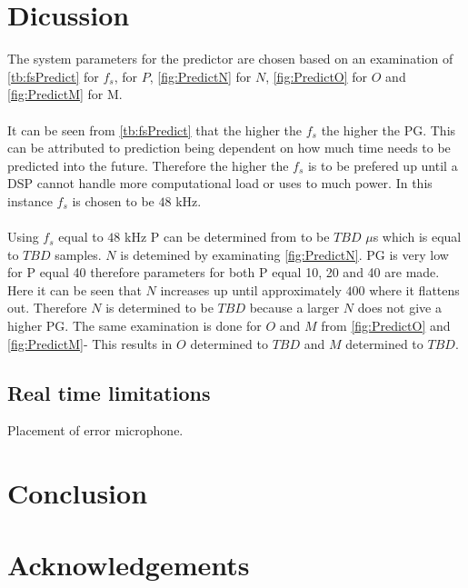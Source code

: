 \section{Dicussion}
The system parameters for the predictor are chosen based on an examination of \autoref{tb:fsPredict} for $f_s$,  for $P$, \autoref{fig:PredictN} for $N$, \autoref{fig:PredictO} for $O$ and \autoref{fig:PredictM} for M.
\\\\
It can be seen from \autoref{tb:fsPredict} that the higher the $f_s$ the higher the PG. This can be attributed to prediction being dependent on how much time needs to be predicted into the future. 
Therefore the higher the $f_s$ is to be prefered up until a DSP cannot handle more computational load or uses to much power. In this instance $f_s$ is chosen to be $48$ kHz. 
\\\\
Using $f_s$ equal to $48$ kHz P can be determined from  to be $TBD$ $\mu$s which is equal to $TBD$ samples. $N$ is detemined by examinating \autoref{fig:PredictN}. PG is very low for P equal 40 therefore parameters for both P equal 10, 20 and 40 are made. Here it can be seen that $N$ increases up until approximately $400$ where it flattens out. Therefore $N$ is determined to be $TBD$ because a larger $N$ does not give a higher PG. The same examination is done for $O$ and $M$ from \autoref{fig:PredictO} and \autoref{fig:PredictM}- This results in $O$ determined to $TBD$ and $M$ determined to $TBD$.   






\subsection*{Real time limitations}
Placement of error microphone.


\section{Conclusion}

\section*{Acknowledgements}
